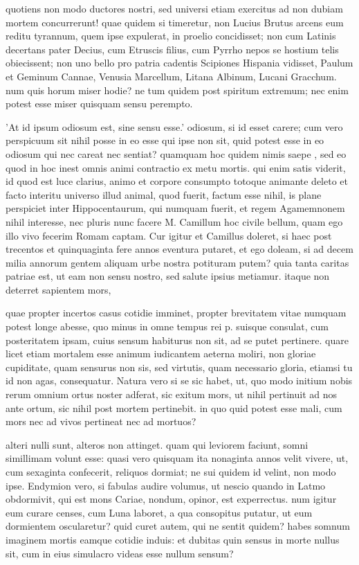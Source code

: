  quotiens non modo ductores nostri, sed universi etiam exercitus ad non dubiam mortem concurrerunt! quae quidem si timeretur, non Lucius Brutus arcens eum reditu tyrannum, quem ipse expulerat, in proelio concidisset; non cum Latinis decertans pater Decius, cum Etruscis filius, cum Pyrrho nepos se hostium telis obiecissent; non uno bello pro patria cadentis Scipiones Hispania vidisset, Paulum et Geminum Cannae, Venusia Marcellum, Litana Albinum, Lucani Gracchum. num quis horum miser hodie? ne tum quidem post spiritum extremum; nec enim potest esse miser quisquam sensu perempto.

 'At id ipsum odiosum est, sine sensu esse.' odiosum, si id esset carere; cum vero perspicuum sit nihil posse in eo esse qui ipse non sit, quid potest esse in eo odiosum qui nec careat nec sentiat? quamquam hoc quidem nimis saepe , sed eo quod in hoc inest omnis animi contractio ex metu mortis. qui enim satis viderit, id quod est luce clarius, animo et corpore consumpto totoque animante deleto et facto interitu universo illud animal, quod fuerit, factum esse nihil, is plane perspiciet inter Hippocentaurum, qui numquam fuerit, et regem Agamemnonem nihil interesse, nec pluris nunc facere M. Camillum hoc civile bellum, quam ego illo vivo fecerim Romam captam. Cur igitur et Camillus doleret, si haec post trecentos et quinquaginta fere annos eventura putaret, et ego doleam, si ad decem milia annorum gentem aliquam urbe nostra potituram putem? quia tanta caritas patriae est, ut eam non sensu nostro, sed salute ipsius metiamur. itaque non deterret sapientem mors,

 quae propter incertos casus cotidie imminet, propter brevitatem vitae numquam potest longe abesse, quo minus in omne tempus rei p. suisque consulat, cum posteritatem ipsam, cuius sensum habiturus non sit, ad se putet pertinere. quare licet etiam mortalem esse animum iudicantem aeterna moliri, non gloriae cupiditate, quam sensurus non sis, sed virtutis, quam necessario gloria, etiamsi tu id non agas, consequatur. Natura vero si se sic habet, ut, quo modo initium nobis rerum omnium ortus noster adferat, sic exitum mors, ut nihil pertinuit ad nos ante ortum, sic nihil post mortem pertinebit. in quo quid potest esse mali, cum mors nec ad vivos pertineat nec ad mortuos?

 alteri nulli sunt, alteros non attinget. quam qui leviorem faciunt, somni simillimam volunt esse: quasi vero quisquam ita nonaginta annos velit vivere, ut, cum sexaginta confecerit, reliquos dormiat; ne sui quidem id velint, non modo ipse. Endymion vero, si fabulas audire volumus, ut nescio quando in Latmo obdormivit, qui est mons Cariae, nondum, opinor, est experrectus. num igitur eum curare censes, cum Luna laboret, a qua consopitus putatur, ut eum dormientem oscularetur? quid curet autem, qui ne sentit quidem? habes somnum imaginem mortis eamque cotidie induis: et dubitas quin sensus in morte nullus sit, cum in eius simulacro videas esse nullum sensum?

